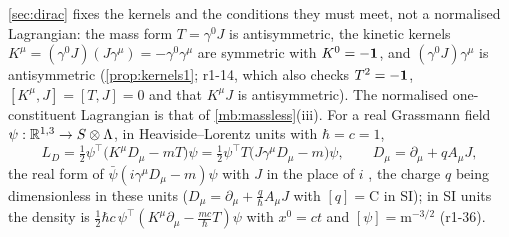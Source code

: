 \cref{sec:dirac} fixes the kernels and the conditions they must meet, not a normalised Lagrangian: the mass form $T=\gamma^0J$
is antisymmetric, the kinetic kernels $K^\mu=(\gamma^0J)(J\gamma^\mu)=-\gamma^0\gamma^\mu$ are symmetric with $K^0=-\mathbf 1$, and
$(\gamma^0J)\gamma^\mu$ is antisymmetric (\cref{prop:kernels1}; r1-14, which also checks $T^2=-\mathbf 1$, $[K^\mu,J]=[T,J]=0$ and that
$K^\mu J$ is antisymmetric). The normalised one-constituent Lagrangian is that of \cref{mb:massless}(iii). For a real Grassmann
field $\psi:\mathbb{R}^{1,3}\to S\otimes\Lambda$, in Heaviside--Lorentz units with $\hbar=c=1$,
\begin{equation}
\label{r1:eq:LD}
L_D=\tfrac12\psi^{\!\top}\bigl(K^\mu D_\mu-mT\bigr)\psi=\tfrac12\psi^{\!\top}T\bigl(J\gamma^\mu D_\mu-m\bigr)\psi,\qquad
D_\mu=\partial_\mu+qA_\mu J ,
\end{equation}
the real form of $\bar\psi(i\gamma^\mu D_\mu-m)\psi$ with $J$ in the place of $i$ \cite{Hestenes67}, the charge $q$ being dimensionless in
these units ($D_\mu=\partial_\mu+\tfrac q\hbar A_\mu J$ with $[q]=\mathrm C$ in SI); in SI units the density is
$\tfrac12\hbar c\,\psi^{\!\top}(K^\mu\partial_\mu-\tfrac{mc}\hbar T)\psi$ with $x^0=ct$ and $[\psi]=\mathrm m^{-3/2}$ (r1-36).

